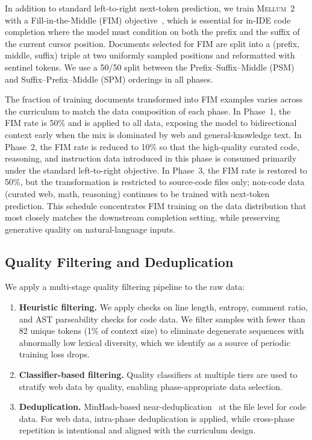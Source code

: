 \documentclass{llmxive}
\providecommand{\modelname}{\textsc{Mellum~2}\xspace}
\begin{document}
In addition to standard left-to-right next-token prediction, we train
\modelname with a Fill-in-the-Middle (FIM) objective~\cite{bavarian2022fim},
which is essential for in-IDE code completion where the model must condition
on both the prefix and the suffix of the current cursor position. Documents
selected for FIM are split into a (prefix, middle, suffix) triple at two
uniformly sampled positions and reformatted with sentinel tokens. We use a
50/50 split between the Prefix--Suffix--Middle (PSM) and
Suffix--Prefix--Middle (SPM) orderings in all phases.

The fraction of training documents transformed into FIM examples varies
across the curriculum to match the data composition of each phase. In
Phase~1, the FIM rate is 50\% and is applied to all data, exposing the
model to bidirectional context early when the mix is dominated by web and
general-knowledge text. In Phase~2, the FIM rate is reduced to 10\% so
that the high-quality curated code, reasoning, and instruction data
introduced in this phase is consumed primarily under the standard
left-to-right objective. In Phase~3, the FIM rate is restored to 50\%, but
the transformation is restricted to source-code files only; non-code data
(curated web, math, reasoning) continues to be trained with next-token
prediction. This schedule concentrates FIM training on the data
distribution that most closely matches the downstream completion setting,
while preserving generative quality on natural-language inputs.

\subsection{Quality Filtering and Deduplication}

We apply a multi-stage quality filtering pipeline to the raw data:

\begin{enumerate}
  \item \textbf{Heuristic filtering.} We apply checks on line length, entropy, comment ratio,
    and AST parseability checks for code data. We filter samples with fewer
    than 82 unique tokens (1\% of context size) to eliminate degenerate
    sequences with abnormally low lexical diversity, which we identify
    as a source of periodic training loss drops.
  \item \textbf{Classifier-based filtering.} Quality classifiers at multiple
    tiers are used to stratify web data by quality, enabling phase-appropriate
    data selection.
  \item \textbf{Deduplication.} MinHash-based near-deduplication~\cite{lee2022deduplicating} at the file
    level for code data. For web data, intra-phase deduplication is applied,
    while cross-phase repetition is intentional and aligned with the curriculum
    design.
\end{enumerate}
\end{document}
